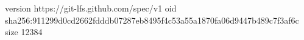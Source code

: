 version https://git-lfs.github.com/spec/v1
oid sha256:911299d0cd2662fdddb07287eb8495f4c53a55a1870fa06d9447b489c7f3af6c
size 12384
